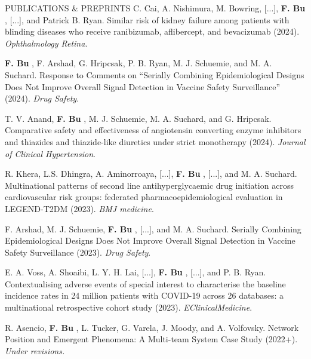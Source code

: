 \documentclass{resume} %
\newcommand{\myName}[1]{
	\textbf{#1}
}
\begin{document}
\begin{rSection}{PUBLICATIONS \& PREPRINTS}
C. Cai, A. Nishimura, M. Bowring, [...], \myName{F. Bu}, [...], and Patrick B. Ryan. Similar risk of kidney failure among patients with blinding diseases who receive ranibizumab, aflibercept, and bevacizumab (2024). \emph{Ophthalmology Retina}.

\smallskip 

\myName{F. Bu}, F. Arshad, G. Hripcsak, P. B. Ryan, M. J. Schuemie, and M. A. Suchard. Response to Comments on ``Serially Combining Epidemiological Designs Does Not Improve Overall Signal Detection in Vaccine Safety Surveillance'' (2024). \emph{Drug Safety}. 

\smallskip 

T. V. Anand, \myName{F. Bu}, M. J. Schuemie, M. A. Suchard, and G. Hripcsak. Comparative safety and effectiveness of angiotensin converting enzyme inhibitors and thiazides and thiazide-like diuretics under strict monotherapy (2024).  \emph{Journal of Clinical Hypertension}.

\smallskip 

R. Khera, L.S. Dhingra, A. Aminorroaya, [...], \myName{F. Bu}, [...], and  M. A. Suchard.  Multinational patterns of second line antihyperglycaemic drug initiation across cardiovascular risk groups: federated pharmacoepidemiological evaluation in LEGEND-T2DM (2023). \emph{BMJ medicine}. 

\smallskip

F. Arshad, M. J. Schuemie, \myName{F. Bu}, [...], and M. A. Suchard. Serially Combining Epidemiological Designs Does Not Improve Overall Signal Detection in Vaccine Safety Surveillance (2023). \emph{Drug Safety}. 

\smallskip

E. A. Voss, A. Shoaibi, L. Y. H. Lai,  [...], \myName{F. Bu}, [...], and P. B. Ryan. Contextualising adverse events of special interest to characterise the baseline incidence rates in 24 million patients with COVID-19 across 26 databases: a multinational retrospective cohort study (2023). \emph{EClinicalMedicine}. 


\smallskip

R. Asencio, \myName{F. Bu}, L. Tucker, G. Varela, J. Moody, and A. Volfovsky. 
Network Position and Emergent Phenomena: A Multi-team System Case Study (2022+). \emph{Under revisions.}


\end{rSection}


\end{document}
